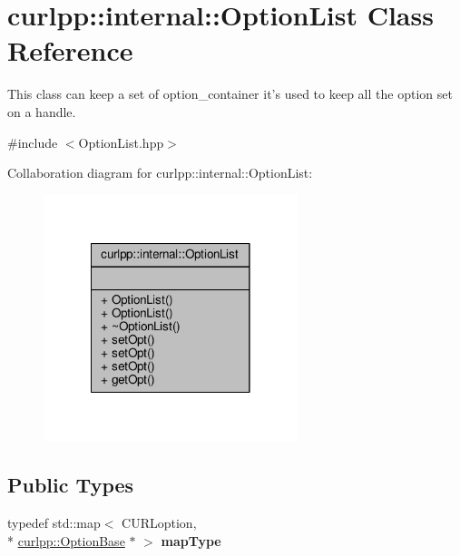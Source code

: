 \hypertarget{classcurlpp_1_1internal_1_1OptionList}{\section{curlpp\-:\-:internal\-:\-:Option\-List Class Reference}
\label{classcurlpp_1_1internal_1_1OptionList}
}


This class can keep a set of option\-\_\-container it's used to keep all the option set on a handle.  




{\ttfamily \#include $<$Option\-List.\-hpp$>$}



Collaboration diagram for curlpp\-:\-:internal\-:\-:Option\-List\-:
\nopagebreak
\begin{figure}[H]
\begin{center}
\leavevmode
\includegraphics[width=210pt]{classcurlpp_1_1internal_1_1OptionList__coll__graph}
\end{center}
\end{figure}
\subsection*{Public Types}
\begin{DoxyCompactItemize}
\item 
\hypertarget{classcurlpp_1_1internal_1_1OptionList_a13b11635f4da1d42cde784135e4b95de}{typedef std\-::map$<$ C\-U\-R\-Loption, \\*
\hyperlink{classcurlpp_1_1OptionBase}{curlpp\-::\-Option\-Base} $\ast$ $>$ {\bfseries map\-Type}}\label{classcurlpp_1_1internal_1_1OptionList_a13b11635f4da1d42cde784135e4b95de}

\end{DoxyCompactItemize}
